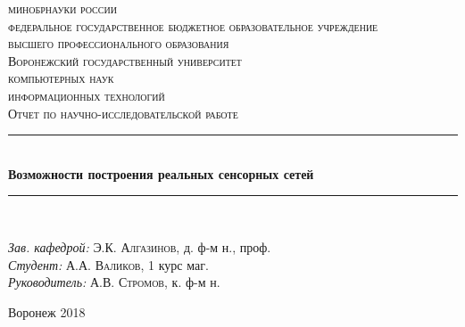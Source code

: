 \documentclass[bibliography=totocnumbered]{scrartcl}
\begin{document}
\begin{titlepage}
\newcommand{\HRule}{\rule{\linewidth}{0.5mm}} %

\center %
 
\textsc {
\footnotesize{
минобрнауки россии\\
федеральное государственное бюджетное образовательное учреждение\\
высшего профессионального образования}\\
\large{Воронежский государственный университет}
}\\[1.0cm] %


\textsc{ компьютерных наук}\\ %
\textsc{ информационных технологий}\\[1.0cm] 
\textsc{\Large Отчет по научно-исследовательской работе}\\[0.5cm] %



\HRule \\[0.4cm]
{ \huge \bfseries Возможности построения реальных сенсорных сетей}\\[0.4cm] %
\HRule \\[1.5cm]
 


\begin{flushleft} \large
\emph{Зав. кафедрой:} Э.К. \textsc{Алгазинов}, д. ф-м н., проф.\\
\emph{Студент:} А.А. \textsc{Валиков}, 1 курс маг. \\ %
\emph{Руководитель:} А.В. \textsc{Стромов}, к. ф-м н. %
\end{flushleft}

\vfill
\begin{center}
Воронеж 2018
\end{center}
\end{titlepage}
\end{document}
